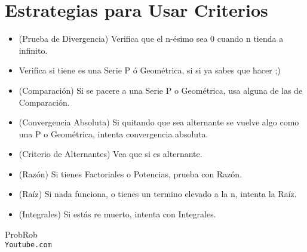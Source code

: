 \documentclass[12pt]{report}                                %
\begin{document}
    \section{Estrategias para Usar Criterios}

    \begin{itemize}
        \item (Prueba de Divergencia) Verifica que el n-ésimo sea 0 cuando n tienda a infinito.
        \item Verifica si tiene es una Serie P ó Geométrica, si si ya sabes que hacer ;)
        \item (Comparación) Si se pacere a una Serie P o Geométrica, usa alguna de las de Comparación.
        \item (Convergencia Absoluta) Si quitando que sea alternante se vuelve algo como una P o Geométrica, intenta convergencia absoluta.
        \item (Criterio de Alternantes) Vea que si es alternante.
        \item (Razón) Si tienes Factoriales o Potencias, prueba con Razón.
        \item (Raíz) Si nada funciona, o tienes un termino elevado a la n, intenta la Raíz.
        \item (Integrales) Si estás re muerto, intenta con Integrales.
    \end{itemize}



\clearpage

    \begin{thebibliography}{9}

        ProbRob
        \\\texttt{Youtube.com}


     

\end{thebibliography}
\end{document}
